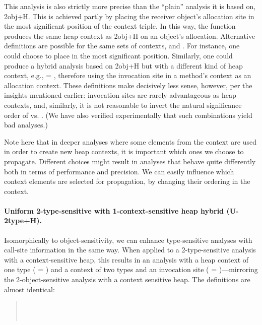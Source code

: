 This analysis is also strictly more precise than the ``plain'' analysis it is based on, 2obj+H. This is achieved partly by placing the receiver object's allocation site in the most significant position of the context triple. In this way, the  function produces the same heap context as 2obj+H on an object's allocation. Alternative definitions are possible for the same sets of contexts,  and . For instance, one could choose to place  in the most significant position. Similarly, one could produce a hybrid analysis based on 2obj+H but with a different kind of heap context, e.g.,  = , therefore using the invocation site in a method's context as an allocation context. These definitions make decisively less sense, however, per the insights mentioned earlier: invocation sites are rarely advantageous as heap contexts, and, similarly, it is not reasonable to invert the natural significance order of  vs. . (We have also verified experimentally that such combinations yield bad analyses.)

Note here that in deeper analyses where some elements from the context are used in order to create new heap contexts, it is important which ones we choose to propagate. Different choices might result in analyses that behave quite differently both in terms of performance and precision. We can easily influence which context elements are selected for propagation, by changing their ordering in the context.

\paragraph[Uniform 2-type-sensitive with 1-context-sensitive heap]{Uniform 2-type-sensitive with 1-context-sensitive heap hybrid (U-2type+H).}
Isomorphically to object-sensitivity, we can enhance type-sensitive analyses with call-site information in the same way. When applied to a 2-type-sensitive analysis with a context-sensitive heap, this results in an analysis with a heap context of one type ( = ) and a context of two types and an invocation site ( = )---mirroring the 2-object-sensitive analysis with a context sensitive heap. The definitions are almost identical:

\begin{quote}
 \\
 \\
\end{quote}


